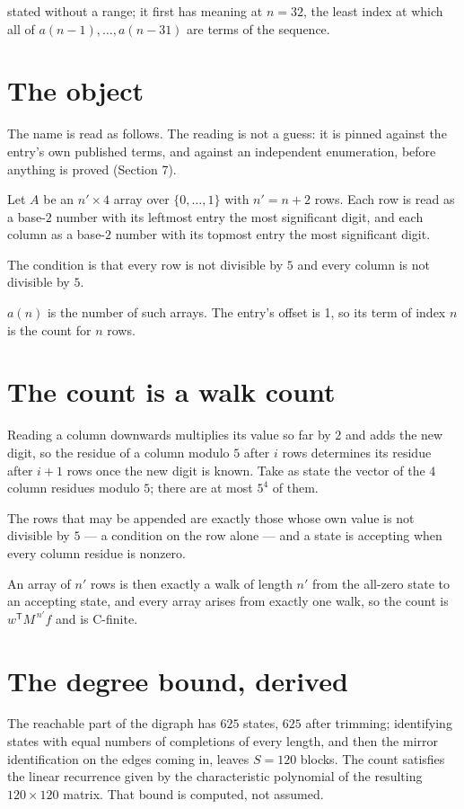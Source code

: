 \documentclass[11pt]{article}
\theoremstyle{definition}
\begin{document}
stated without a range; it first has meaning at $n = 32$, the least index at which all of $a(n-1),\dots,a(n-31)$ are terms of the sequence.

\section{The object}

The name is read as follows. The reading is not a guess: it is pinned against the entry's own published terms, and against an independent enumeration, before anything is proved (Section 7).

Let $A$ be an $n' \times 4$ array over $\{0,\dots,1\}$ with $n' = n + 2$ rows. Each row is read as a base-$2$ number with its leftmost entry the most significant digit, and each column as a base-$2$ number with its topmost entry the most significant digit.

The condition is that every row is not divisible by $5$ and every column is not divisible by $5$.

$a(n)$ is the number of such arrays. The entry's offset is 1, so its term of index $n$ is the count for $n$ rows.

\section{The count is a walk count}

Reading a column downwards multiplies its value so far by $2$ and adds the new digit, so the residue of a column modulo $5$ after $i$ rows determines its residue after $i+1$ rows once the new digit is known. Take as state the vector of the $4$ column residues modulo $5$; there are at most $5^{4}$ of them.

The rows that may be appended are exactly those whose own value is not divisible by $5$ --- a condition on the row alone --- and a state is accepting when every column residue is nonzero.

An array of $n'$ rows is then exactly a walk of length $n'$ from the all-zero state to an accepting state, and every array arises from exactly one walk, so the count is $w^{\mathsf T}M^{\,n'}f$ and is C-finite.

\section{The degree bound, derived}

The reachable part of the digraph has $625$ states, $625$ after trimming; identifying states with equal numbers of completions of every length, and then the mirror identification on the edges coming in, leaves $S = 120$ blocks. The count satisfies the linear recurrence given by the characteristic polynomial of the resulting $120\times120$ matrix. That bound is computed, not assumed.
\end{document}
